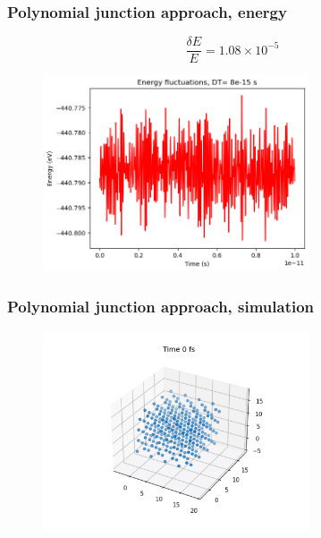 \documentclass{beamer}
\begin{document}
\begin{frame}
    \frametitle{Polynomial junction approach, energy}

    $$\frac{\delta E}{E}= 1.08 \times 10^{-5}$$
    \begin{figure}
        \includegraphics[width=0.7\textwidth]{images/energyjunction.png}
    \end{figure}

\end{frame}

\begin{frame}
    \frametitle{Polynomial junction approach, simulation}

    \begin{figure}
        \includegraphics[width=0.7\textwidth]{images/thumbnail.png}
    \end{figure}

\end{frame}
\end{document}

